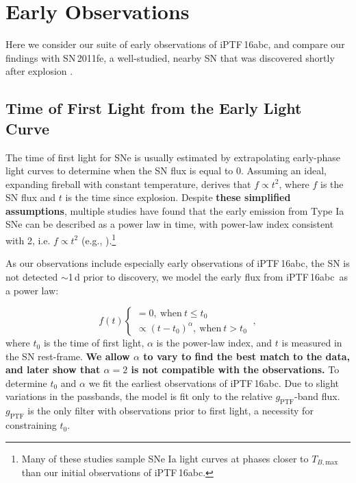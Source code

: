 \documentclass[twocolumn]{aastex61}
\newcommand{\abc}{iPTF\,16abc}
\begin{document}
\section{Early Observations}
\label{sec:first_light}

Here we consider our suite of early observations of \abc, and compare our
findings with SN\,2011fe, a well-studied, nearby SN that was discovered
shortly after explosion
\citep{2011Natur.480..344N,2012ApJ...744L..17B,2014ApJ...784...85P}.

\subsection{Time of First Light from the Early Light Curve}
\label{sec:lc_fit}

The time of first light for SNe is usually estimated by extrapolating
early-phase light curves to determine when the SN flux is equal to 0.
Assuming an ideal, expanding fireball with constant temperature,
\citet{1982ApJ...253..785A} derives that $f \propto t^2$, where $f$ is the SN
flux and $t$ is the time since explosion. Despite \textbf{these simplified assumptions}, multiple studies have found that the
early emission from Type Ia SNe can be described as a power law in time, with
power-law index consistent with 2, i.e. $f \propto t^2$ (e.g.,
\citealt{2006AJ....132.1707C, 2010ApJ...712..350H,
2011MNRAS.416.2607G}).\footnote{Many of these studies
sample SNe Ia light curves at phases closer to $T_{B,\mathrm{max}}$
than our initial observations of \abc.}

As our observations include especially early observations of \abc, the SN is
not detected $\sim$1\,d prior to discovery, we model the early flux from \abc\
as a power law:

\begin{equation}
  \label{eq:broken_power_law}
  f(t) \left\{
    \begin{array}{ll}
      = 0,\ \textrm{when}\ t \le t_0 \\
      \propto (t-t_0)^{\alpha},\ \textrm{when}\ t>t_0
    \end{array}
  \right.\ ,
\end{equation}
% 
where $t_0$ is the time of first light, $\alpha$ is the power-law index, and
$t$ is measured in the SN rest-frame. \textbf{We allow $\alpha$ to vary to
find the best match to the data, and later show that $\alpha = 2$ is not
compatible with the observations.} To determine $t_0$ and $\alpha$ we fit the
earliest observations of \abc. Due to slight variations in the passbands, the
model is fit only to the relative $g_\mathrm{PTF}$-band flux. $g_\mathrm{PTF}$
is the only filter with observations prior to first light, a necessity for
constraining $t_0$.
\end{document}
